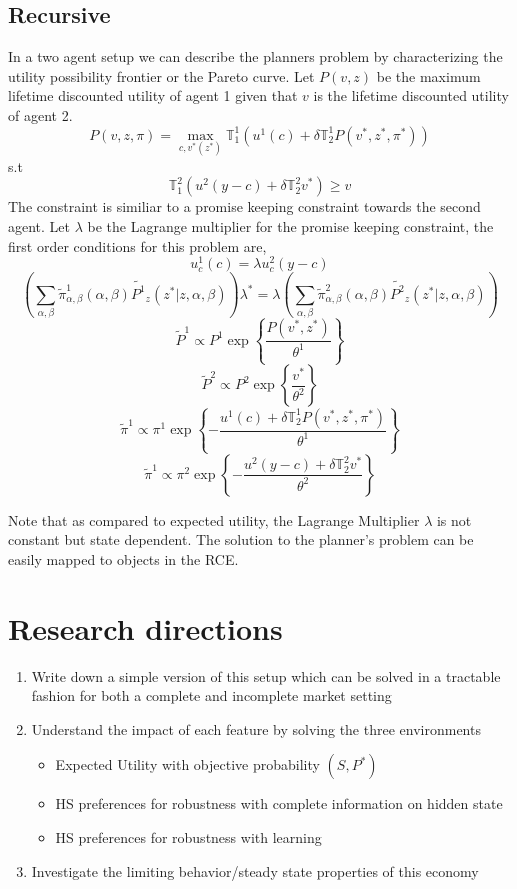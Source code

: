 \documentclass[a4paper,12pt]{article}
\begin{document}
\subsection{Recursive}
In a two agent setup we can describe the planners problem by characterizing the utility possibility frontier or the Pareto curve. Let $P(v,z)$ be the maximum lifetime discounted utility of agent 1 given that $v$ is the lifetime discounted utility of agent 2.
\[P(v,z,\pi)=\max_{c,v^*(z^*)} \mathbb{T}^1_1\left(u^1(c)+\delta \mathbb{T}^1_2 P(v^*,z^*,\pi^*)\right)\]
s.t
\[\mathbb{T}^2_1\left(u^2(y-c)+\delta \mathbb{T}^2_2 v^*\right)\geq v\] 
The constraint is similiar to a promise keeping constraint towards the second agent. Let $\lambda$ be the Lagrange multiplier for the promise keeping constraint, the  first order conditions for this problem are,
\[u^1_c(c)=\lambda u^2_c(y-c)\]
\[\left(\sum_{\alpha,\beta}\tilde{\pi}^1_{\alpha,\beta}(\alpha,\beta)\tilde{P^1}_z(z^* |z,\alpha,\beta)\right)\lambda^*=\lambda\left(\sum_{\alpha,\beta}\tilde{\pi}^2_{\alpha,\beta}(\alpha,\beta)\tilde{P^2}_z(z^* |z,\alpha,\beta)\right) \]
\[\tilde{P}^1 \propto P^1\exp\left\{\frac{P(v^*,z^*)}{\theta^1}\right\}\]
\[\tilde{P}^2 \propto P^2\exp\left\{\frac{v^*}{\theta^2}\right\}\]
\[\tilde{\pi}^1 \propto \pi^1 \exp\left\{-\frac{ u^1(c)+\delta \mathbb{T}^1_2 P(v^*,z^*,\pi^*) }{\theta^1}\right\}\]
\[\tilde{\pi}^1 \propto \pi^2 \exp\left\{-\frac{u^2(y-c)+\delta \mathbb{T}^2_2 v^*}{\theta^2}\right\}\]

\noindent Note that as compared to expected utility, the Lagrange Multiplier $\lambda$ is not constant but state dependent. The solution to the planner's problem can be easily mapped to objects in the RCE.
\section{Research directions}
\begin{enumerate}
	\item Write down a simple version of this setup which can be solved in a tractable fashion for both a complete and incomplete market setting
		\item Understand the impact of each feature by solving the three environments
	
\begin{itemize}
	\item Expected Utility with objective probability $(S,P^*)$
	\item HS preferences for robustness with complete information on hidden state
	\item HS preferences for robustness with learning


\end{itemize}

\item Investigate the limiting behavior/steady state properties of this economy
\end{enumerate}


\clearpage %
\vskip90pt %
\nocite{*}

\clearpage
\end{document}
